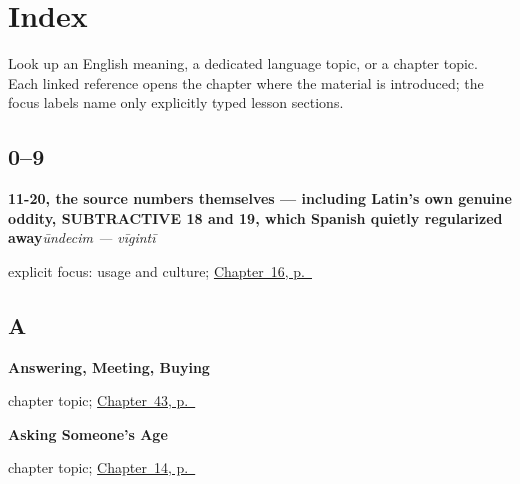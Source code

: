 
\chapter*{Index}

Look up an English meaning, a dedicated language topic, or a chapter topic. Each linked reference opens the chapter where the material is introduced; the focus labels name only explicitly typed lesson sections.

\section*{0--9}

\noindent\begin{minipage}[t]{\linewidth}
\raggedright
\textbf{11-20, the source numbers themselves — including Latin's own genuine oddity, SUBTRACTIVE 18 and 19, which Spanish quietly regularized away}\enspace\emph{ūndecim — vīgintī}\par
\footnotesize explicit focus: usage and culture; \hyperref[ch:la-numbers-eleven-to-twenty]{Chapter~16, p.~\pageref*{ch:la-numbers-eleven-to-twenty}}
\end{minipage}\par\smallskip

\section*{A}

\noindent\begin{minipage}[t]{\linewidth}
\raggedright
\textbf{Answering, Meeting, Buying}\par
\footnotesize chapter topic; \hyperref[ch:la-answering-meeting-buying]{Chapter~43, p.~\pageref*{ch:la-answering-meeting-buying}}
\end{minipage}\par\smallskip

\noindent\begin{minipage}[t]{\linewidth}
\raggedright
\textbf{Asking Someone's Age}\par
\footnotesize chapter topic; \hyperref[ch:la-asking-age]{Chapter~14, p.~\pageref*{ch:la-asking-age}}
\end{minipage}\par\smallskip

